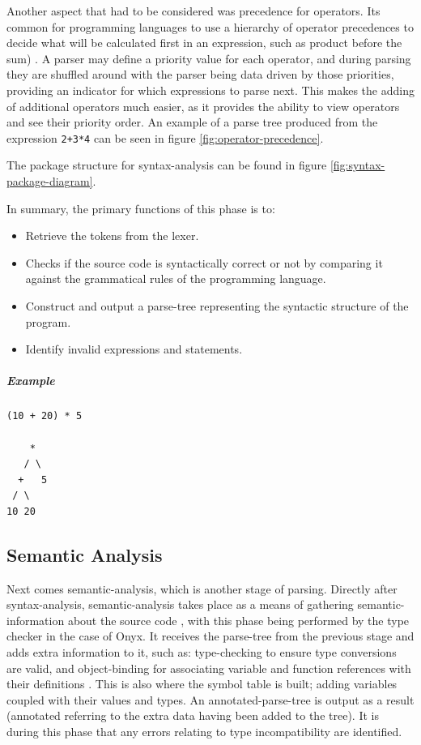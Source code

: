 \documentclass[
]{report}
\begin{document}
Another aspect that had to be considered was precedence for operators.
Its common for programming languages to use a hierarchy of operator precedences
to decide what will be calculated first in an expression, such as product before
the sum) \cite{compiler-design-book}. A parser may define a priority value for
each operator, and during \gls{parsing} they are shuffled around with the parser
being data driven by those priorities, providing an indicator for which \glspl{expression}
to parse next. This makes the adding of additional operators much easier, as it
provides the ability to view operators and see their priority order. An example
of a parse tree produced from the expression \texttt{2+3*4} can be seen in figure \ref{fig:operator-precedence}.

The package structure for \gls{syntax-analysis} can be found in figure \ref{fig:syntax-package-diagram}.

In summary, the primary functions of this phase is to:
\begin{itemize}
	\item Retrieve the \glspl{token} from the lexer.
	\item Checks if the source code is syntactically correct or not by comparing it against the grammatical rules of the programming language.
	\item Construct and output a \gls{parse-tree} representing the syntactic structure of the program.
	\item Identify invalid \glspl{expression} and \glspl{statement}.
\end{itemize}

\subparagraph{Example}
\begin{verbatim}
(10 + 20) * 5

    *
   / \
  +   5
 / \  
10 20
\end{verbatim}

\subsection{Semantic Analysis}
Next comes \gls{semantic-analysis}, which is another stage of \gls{parsing}.
Directly after \gls{syntax-analysis}, \gls{semantic-analysis} takes place as a means
of gathering \gls{semantic-information} about the source code \cite{semantics-wiki}, with
this phase being performed by the type checker in the case of Onyx. It
receives the \gls{parse-tree} from the previous stage and adds extra
information to it, such as: \gls{type-checking} to ensure type conversions are
valid, and \gls{object-binding} for associating variable and function
references with their definitions \cite{compiler-wiki}. This is also where the \gls{symbol}
table is built; adding variables coupled with their values and types. An
\gls{annotated-parse-tree} is output as a result (annotated referring to the
extra data having been added to the tree). It is during this phase that
any errors relating to type incompatibility are identified.
\end{document}

